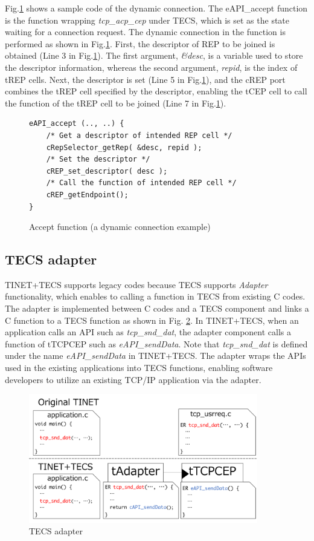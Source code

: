 \documentclass[a4j,12pt,oneside,openany,english]{jsbook}
\begin{document}
Fig.\ref{src:DynamicCcode} shows a sample code of the dynamic connection.
The eAPI\_accept function is the function wrapping {\it tcp\_acp\_cep} under TECS, which is set as the state waiting for a connection request.
The dynamic connection in the function is performed as shown in Fig.\ref{src:DynamicCcode}.
First, the descriptor of REP to be joined is obtained (Line 3 in Fig.\ref{src:DynamicCcode}).
The first argument, {\it \&desc}, is a variable used to store the descriptor information, whereas the second argument, {\it repid}, is the index of tREP cells.
Next, the descriptor is set (Line 5 in Fig.\ref{src:DynamicCcode}), and the cREP port combines the tREP cell specified by the descriptor, enabling the tCEP cell to call the function of the tREP cell to be joined (Line 7 in Fig.\ref{src:DynamicCcode}).

\begin{figure}[t]
\centering
\begin{lstlisting}
eAPI_accept (.., ..) {
    /* Get a descriptor of intended REP cell */
    cRepSelector_getRep( &desc, repid );
    /* Set the descriptor */
    cREP_set_descriptor( desc );
    /* Call the function of intended REP cell */
    cREP_getEndpoint();
}
\end{lstlisting}
\caption{Accept function (a dynamic connection example)}
\label{src:DynamicCcode}
\end{figure}



\subsection{TECS adapter}
\label{sec:TECSAdapter}

TINET+TECS supports legacy codes because TECS supports {\it Adapter} functionality, which enables to calling a function in TECS from existing C codes.
The adapter is implemented between C codes and a TECS component and links a C function to a TECS function as shown in Fig. \ref{fig:TECSAdapter}.
In TINET+TECS, when an application calls an API such as {\it tcp\_snd\_dat}, the adapter component calls a function of tTCPCEP such as {\it eAPI\_sendData}.
Note that {\it tcp\_snd\_dat} is defined under the name {\it eAPI\_sendData} in TINET+TECS.
The adapter wraps the APIs used in the existing applications into TECS functions, enabling software developers to utilize an existing TCP/IP application via the adapter.

\begin{figure}[t]
    \centering
    \includegraphics[width=10cm,clip]{figure/TECSAdapter.pdf}
    \caption{TECS adapter}
    \label{fig:TECSAdapter}
\end{figure}
\end{document}
